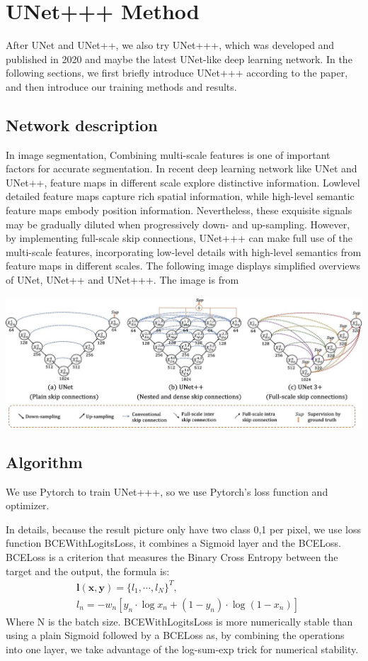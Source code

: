 \section{UNet+++ Method}
After UNet and UNet++, we also try UNet+++\cite{unet_ppp},
which was developed and published in 2020 and maybe the latest UNet-like deep learning network.
In the following sections, we first briefly introduce UNet+++ according to the paper, and then introduce our training methods and results.

\subsection{Network description}
In image segmentation, Combining multi-scale features is one of important factors for accurate segmentation.
In recent deep learning network like UNet and UNet++, feature maps in different scale explore distinctive information. Lowlevel detailed feature maps capture rich spatial information, 
while high-level semantic feature maps embody position information. 
Nevertheless, these exquisite signals may be gradually diluted when progressively down- and up-sampling.
However, by implementing full-scale skip connections, UNet+++ can make full use of the multi-scale features, incorporating low-level details with high-level semantics from feature maps in different scales. 
The following image displays simplified overviews of UNet, UNet++ and UNet+++. The image is from \cite{unet_ppp}

\includegraphics[width=\linewidth]{figuras/UNet+++.jpg}

\subsection{Algorithm}
We use Pytorch to train UNet+++, so we use Pytorch's loss function and optimizer.

In details, because the result picture only have two class 0,1 per pixel, we use loss function BCEWithLogitsLoss, it combines a Sigmoid layer and the BCELoss. 
BCELoss is a criterion that measures the Binary Cross Entropy between the target and the output, the formula is:
\[\begin{aligned}
    &\bm{l}(\bm{x}, \bm{y})=\{l_1, \cdots, l_N\}^T, \\
    &l_n=-w_n[y_n\cdot\log{x_n}+(1-y_n)\cdot\log{(1-x_n)}]
\end{aligned}\]
Where N is the batch size. BCEWithLogitsLoss is more numerically stable than using a plain Sigmoid followed by a BCELoss as, 
by combining the operations into one layer, we take advantage of the log-sum-exp trick for numerical stability.

